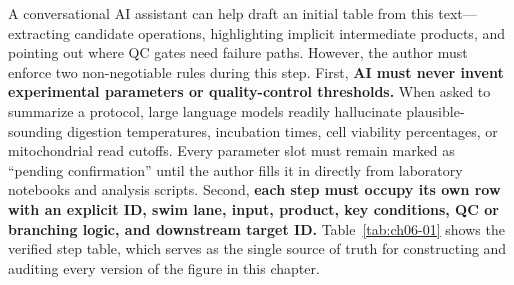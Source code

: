 A conversational AI assistant can help draft an initial table from this text—extracting candidate operations, highlighting implicit intermediate products, and pointing out where QC gates need failure paths. However, the author must enforce two non-negotiable rules during this step. First, \textbf{AI must never invent experimental parameters or quality-control thresholds.} When asked to summarize a protocol, large language models readily hallucinate plausible-sounding digestion temperatures, incubation times, cell viability percentages, or mitochondrial read cutoffs. Every parameter slot must remain marked as ``pending confirmation'' until the author fills it in directly from laboratory notebooks and analysis scripts. Second, \textbf{each step must occupy its own row with an explicit ID, swim lane, input, product, key conditions, QC or branching logic, and downstream target ID.} Table~\ref{tab:ch06-01} shows the verified step table, which serves as the single source of truth for constructing and auditing every version of the figure in this chapter.

